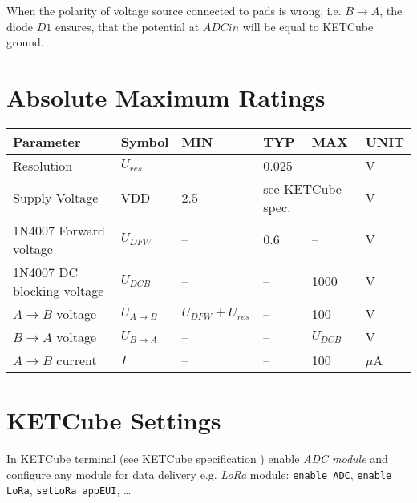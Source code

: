 When the polarity of voltage source connected to pads is wrong, i.e. $B \rightarrow A$, the diode $D1$ ensures, that the potential at $ADCin$ will be equal to KETCube ground.

\clearpage
\section{Absolute Maximum Ratings}
  \begin{table*}[!ht]
    \hspace*{-4cm}
    \begin{tabular}{| p{3.5cm} | p{1.5cm} | p{2cm} | p{2cm} | p{2cm} | p{1cm} |}
        \hline
        \rowcolor{SeaGreen3!30!} {\bf Parameter} & {\bf Symbol} & {\bf MIN} & {\bf TYP} & {\bf MAX} & {\bf UNIT} \\
        \hline
        \hline
        Resolution & $U_{res}$ & -- & 0.025 & -- & V\\
        \hline
        \hline
        Supply Voltage & VDD & 2.5\footnotemark & \multicolumn{2}{l|}{see KETCube spec. \cite{ZCU:KETCube:05-2018}} & V \\
        \hline 
        1N4007 Forward voltage & $U_{DFW}$ & -- & 0.6 & -- & V\\
        \hline 
        1N4007 DC blocking voltage & $U_{DCB}$ & -- & -- & 1000 & V\\
        \hline 
        $A \rightarrow B$ voltage & $U_{A \rightarrow B}$ & $U_{DFW} + U_{res}$ & -- & 100 & V\\
        \hline 
        $B \rightarrow A$ voltage & $U_{B \rightarrow A}$ & -- & -- & $U_{DCB}$ & V\\
        \hline 
        $A \rightarrow B$ current & $I$ & -- & -- & 100 & $\mu$A\\
        \hline
    \end{tabular}
    \label{tab:spec:AMR}
   \end{table*}

\clearpage
\section{KETCube Settings}
  In KETCube terminal (see KETCube specification \cite{ZCU:KETCube:05-2018}) enable {\it ADC module} and configure any module for data delivery e.g. {\it LoRa} module: {\tt enable ADC}, {\tt enable LoRa}, {\tt setLoRa appEUI}, \dots

